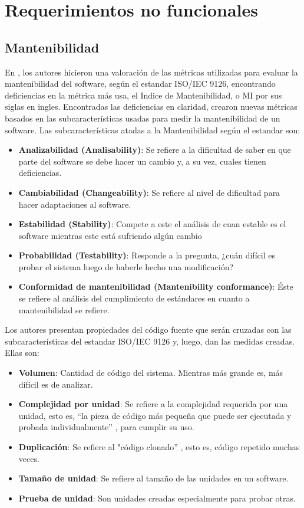 \section{Requerimientos no funcionales}

\subsection{Mantenibilidad}

En \cite{measuring_maintainability}, los autores hicieron una valoración de las métricas utilizadas para evaluar la mantenibilidad del software, según el estandar ISO/IEC 9126, encontrando deficiencias en la métrica más usa, el Indice de Mantenibilidad, o MI por sus siglas en ingles. Encontradas las deficiencias en claridad, crearon nuevas métricas basados en las subcaracterísticas usadas para medir la mantenibilidad de un software. Las subcaracterísticas atadas a la Mantenibilidad según el estandar son:

\begin{itemize}
 \item \textbf{Analizabilidad (Analisability)}: Se refiere a la dificultad de saber en que parte del software se debe hacer un cambio y, a su vez, cuales tienen deficiencias.
 \item \textbf{Cambiabilidad (Changeability)}: Se refiere al nivel de dificultad para hacer adaptaciones al software.
 \item \textbf{Estabilidad (Stability)}: Compete a este el análisis de cuan estable es el software mientras este está sufriendo algún cambio
 \item \textbf{Probabilidad (Testability)}: Responde a la pregunta, ¿cuán difícil es probar el sistema luego de haberle hecho una modificación?
 \item \textbf{Conformidad de mantenibilidad (Mantenibility conformance)}: Éste se refiere al análisis del cumplimiento de estándares en cuanto a mantenibilidad se refiere.
\end{itemize}

Los autores presentan propiedades del código fuente que serán cruzadas con las subcaracterísticas del estandar ISO/IEC 9126 y, luego, dan las medidas creadas. Ellas son:

\begin{itemize}
 \item \textbf{Volumen}: Cantidad de código del sistema. Mientras más grande es, más difícil es de analizar.
 \item \textbf{Complejidad por unidad}: Se refiere a la complejidad requerida por una unidad, esto es, “la pieza de código más pequeña que puede ser ejecutada y probada individualmente” \cite{measuring_maintainability}, para cumplir su uso.
 \item \textbf{Duplicación}: Se refiere al "código clonado” \cite{measuring_maintainability}, esto es, código repetido muchas veces.
 \item \textbf{Tamaño de unidad}: Se refiere al tamaño de las unidades en un software.
 \item \textbf{Prueba de unidad}: Son unidades creadas especialmente para probar otras.
\end{itemize}

